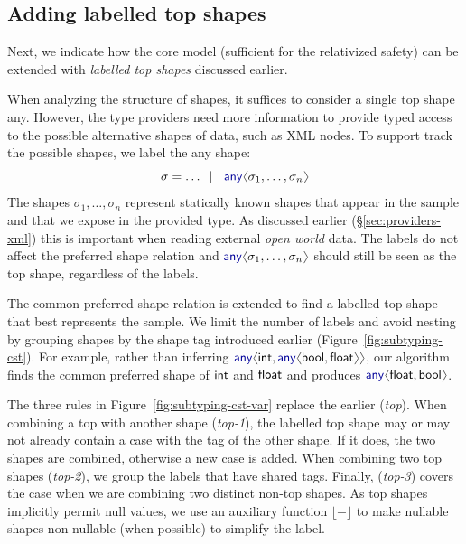 \documentclass[10pt,preprint,blind,clearpagebib]{sigplanconf}
\newcommand{\langl}{\begin{picture}(4.5,7)
\put(1.1,2.5){\rotatebox{60}{\line(1,0){5.5}}}
\put(1.1,2.5){\rotatebox{300}{\line(1,0){5.5}}}
\end{picture}}
\newcommand{\rangl}{\begin{picture}(4.5,7)
\put(.9,2.5){\rotatebox{120}{\line(1,0){5.5}}}
\put(.9,2.5){\rotatebox{240}{\line(1,0){5.5}}}
\end{picture}}
\newcommand{\kvd}[1]{\textnormal{\textcolor{kvdclr}{\sffamily #1}}}
\newcommand{\ident}[1]{\textnormal{\sffamily #1}}
\newcommand{\lsep}[0]{\;\; | \;\;}
\newcommand{\dropopt}[1]{\lfloor#1\rfloor}
\begin{document}
\subsection{Adding labelled top shapes}
\label{sec:inference-vars}

Next, we indicate how the core model (sufficient for the relativized safety) 
can be extended with \emph{labelled top shapes} discussed earlier.

When analyzing the structure of shapes, it suffices to consider a single top shape \kvd{any}.
However, the type providers need more information to provide typed access to the possible 
alternative shapes of data, such as XML nodes. To support track the possible shapes, we label 
the \kvd{any} shape:
%
\begin{equation*}
\sigma = \ldots \lsep \kvd{any}\langl \sigma_1, \ldots, \sigma_n\rangl
\end{equation*}
%
The shapes $\sigma_1, \ldots, \sigma_n$ represent statically known shapes that appear in the
sample and that we expose in the provided type. As discussed earlier (\S\ref{sec:providers-xml})
this is important when reading external \emph{open world} data. The labels do not affect the 
preferred shape relation and $\kvd{any}\langl \sigma_1, \ldots, \sigma_n\rangl$ should still be
seen as the top shape, regardless of the labels.

The common preferred shape relation is extended to find a labelled top shape that best represents 
the sample. We limit the number of labels and avoid nesting by grouping shapes by the shape tag 
introduced earlier (Figure~\ref{fig:subtyping-cst}).
For example, rather than inferring $\kvd{any}\langl\ident{int}, \kvd{any}\langl\ident{bool}, \ident{float}\rangl\rangl$, 
our algorithm finds the common preferred shape of $\ident{int}$ and $\ident{float}$ and produces 
$\kvd{any}\langl\ident{float},\ident{bool}\rangl$. 

The three rules in Figure~\ref{fig:subtyping-cst-var} replace the earlier (\emph{top}). When 
combining a top with another shape (\emph{top-1}), the labelled top shape may or may not already 
contain a case with the tag of the other shape. If it does, the two shapes are combined, otherwise 
a new case is added. When combining two top shapes (\emph{top-2}), we group the labels that have 
shared tags. Finally, (\emph{top-3}) covers the case when we are combining two distinct non-top 
shapes. As top shapes implicitly permit \kvd{null} values, we use an auxiliary function $\dropopt{-}$ 
to make nullable shapes non-nullable (when possible) to simplify the label.
\end{document}
